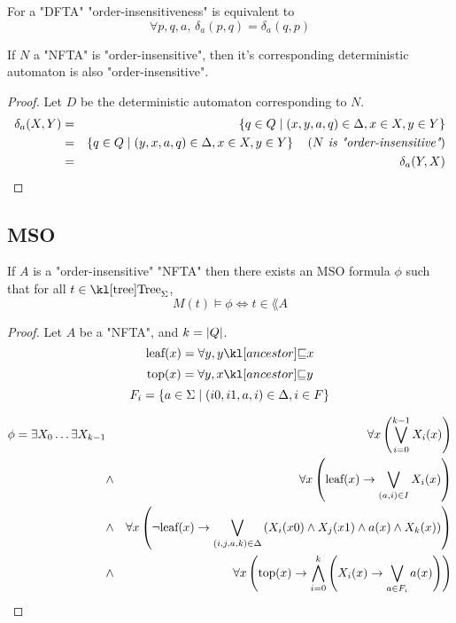 \documentclass{article}
\begin{document}
\begin{remark}
	For a "DFTA" "order-insensitiveness" is equivalent to
	\[ \forall p,q,a,\, \delta_a (p,q) = \delta_a (q,p) \]
\end{remark}


\begin{lemma}
	If $N$ a "NFTA" is "order-insensitive", then it's corresponding deterministic automaton is also "order-insensitive".
\end{lemma}

\begin{proof}
	Let $D$ be the deterministic automaton corresponding to $N$.
	\begin{eqnarray*}
		\delta_a (X,Y) &=& \left\{q \in Q \mid (x,y,a,q) \in \Delta, x \in X, y \in Y\right\} \\
		&=& \left\{q \in Q \mid (y,x,a,q) \in \Delta, x \in X, y \in Y\right\}  \quad\left(\textit{$N$ is "order-insensitive"}\right) \\
		&=& \delta_a (Y,X)
	\end{eqnarray*}
\end{proof}

\subsection{MSO}

\begin{lemma}
	If $A$ is a "order-insensitive" "NFTA"  then there exists an MSO formula $\phi$ such that for all $t \in \tree_{\Sigma}$,
	\[ M(t) \models \phi \iff t \in \lang A \]
\end{lemma}

\begin{proof}
	Let $A$ be a "NFTA", and $k = \left|Q\right|$.
	\[\text{leaf} (x) = \forall y, \ancestor y x \]
	\[\text{top} (x) = \forall y, \ancestor x y \]
	\[F_i = \left\{a \in \Sigma \mid (i0,i1,a,i) \in \Delta, i \in F\right\}\]


	\begin{eqnarray*}
		\phi = \exists X_0 \ldots \exists X_{k-1} &\ & \forall x \left( \bigvee_{i=0}^{k-1} X_i(x) \right) \\
		&\land& \forall x \left( \text{leaf} (x) \rightarrow \bigvee_{(a,i)\in I}  X_i(x)   \right) \\
		&\land& \forall x \left(\lnot \text{leaf}(x) \rightarrow \bigvee_{(i,j,a,k)\in \Delta}  \left(X_i(x0) \land X_j(x1) \land a(x) \land X_k(x)\right)\right) \\
		&\land& \forall x \left(\text{top}(x) \rightarrow \bigwedge_{i= 0}^k \left( X_i(x) \rightarrow \bigvee_{a \in F_i} a(x) \right)\right)
	\end{eqnarray*}


\end{proof}





\end{document}
